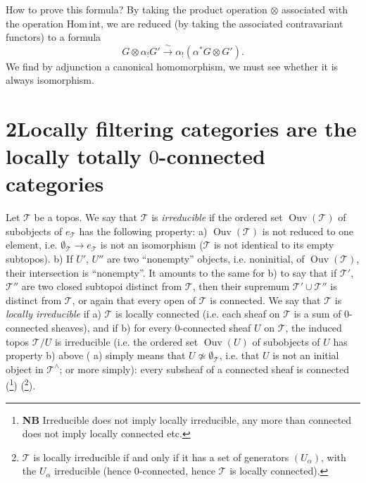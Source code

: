 \documentclass[11pt]{article}
\newcommand{\printedpage}[1]{\marginpar{\footnotesize p.~#1}}
\newcommand{\msp}[1]{\marginpar{\footnotesize [#1]}}
\begin{document}
How to prove this formula? By taking the product operation $\otimes$ associated with the operation Hom\,int, we are reduced (by taking the associated contravariant functors) to a formula
\[ G \otimes \alpha_!G' \xrightarrow{\ \sim\ } \alpha_!(\alpha^*G \otimes G'). \]
We find by adjunction a canonical homomorphism, we must see whether it is always isomorphism.

\printedpage{7}
\msp{page 11}

\section*{2\quad Locally filtering categories are the locally totally $0$-connected categories}

Let $\mathcal{T}$ be a topos. We say that $\mathcal{T}$ is \textit{irreducible} if the ordered set $\operatorname{Ouv}(\mathcal{T})$ of subobjects of $e_{\mathcal{T}}$ has the following property: a) $\operatorname{Ouv}(\mathcal{T})$ is not reduced to one element, i.e. $\emptyset_{\mathcal{T}} \longrightarrow e_{\mathcal{T}}$ is not an isomorphism ($\mathcal{T}$ is not identical to its empty subtopos). b) If $U'$, $U''$ are two ``nonempty'' objects, i.e. noninitial, of $\operatorname{Ouv}(\mathcal{T})$, their intersection is ``nonempty''. It amounts to the same for b) to say that if $\mathcal{T}'$, $\mathcal{T}''$ are two closed subtopoi distinct from $\mathcal{T}$, then their supremum $\mathcal{T}' \cup \mathcal{T}''$ is distinct from $\mathcal{T}$, or again that every open of $\mathcal{T}$ is connected. We say that $\mathcal{T}$ is \textit{locally irreducible} if a) $\mathcal{T}$ is locally connected (i.e. each sheaf on $\mathcal{T}$ is a sum of 0-connected sheaves), and if b) for every 0-connected sheaf $U$ on $\mathcal{T}$, the induced topos $\mathcal{T}/U$ is irreducible (i.e. the ordered set $\operatorname{Ouv}(U)$ of subobjects of $U$ has property b) above ( a) simply means that $U \not\simeq \emptyset_{\mathcal{T}}$, i.e. that $U$ is not an initial object in $\mathcal{T}^\wedge$; or more simply): every subsheaf of a connected sheaf is connected (\footnote[5]{\textbf{NB} Irreducible does not imply locally irreducible, any more than connected does not imply locally connected etc.}) (\footnote[6]{$\mathcal{T}$ is locally irreducible if and only if it has a set of generators $(U_\alpha)$, with the $U_\alpha$ irreducible (hence 0-connected, hence $\mathcal{T}$ is locally connected).}).
\end{document}
